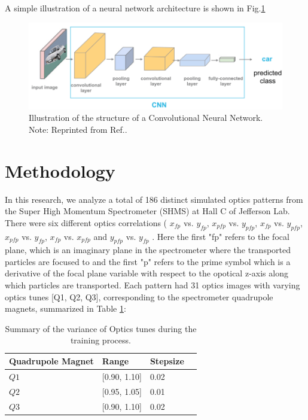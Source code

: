 \documentclass[conference]{IEEEtran}
\begin{document}
A simple illustration of a neural network architecture is shown in Fig.\ref{fig:CNN_Image} 
\begin{figure}[h]
 \centering
  \includegraphics[scale=0.3]{images/ConvolutionalNeuralNetwork.png}
  \caption{Illustration of the structure of a Convolutional Neural Network. \\ \centering Note: Reprinted from Ref.\cite{CNN_Image}.}
  \label{fig:CNN_Image}
\end{figure}



\section{Methodology}
In this research, we analyze a total of 186 distinct simulated optics patterns from the Super High Momentum Spectrometer (SHMS) at Hall C of Jefferson Lab.
There were six different optics correlations ( $x_{fp}$ vs. $y_{fp}$,  $x_{pfp}$ vs. $y_{pfp}$, $x_{fp}$ vs. $y_{pfp}$,  $x_{pfp}$ vs. $y_{fp}$, $x_{fp}$ vs. $x_{pfp}$ and  $y_{pfp}$ vs. $y_{fp}$ . Here the first "fp" refers to the focal plane, which is an imaginary plane in the spectrometer where the transported particles are focused to and the first "p" refers to the prime symbol which is a derivative of the focal plane variable with respect to the opotical z-axis along which particles are transported. Each pattern had 31 optics images with varying optics tunes [Q1, Q2, Q3], corresponding to the spectrometer quadrupole magnets, summarized in Table \ref{tab:tune_stpSize}:

\begin{table}[ht!]
	\begin{center}
		\begin{tabular}{llll} %
                  \hline
                  Quadrupole Magnet & Range & Stepsize \\
                  \hline\hline
	          $Q1$ & [0.90, 1.10] & 0.02  \\
                  $Q2$ & [0.95, 1.05] & 0.01  \\
                  $Q3$ & [0.90, 1.10] & 0.02  \\                       
                  \hline 
		\end{tabular}
	\end{center}
	\caption{Summary of the variance of Optics tunes during the training process.}
	\label{tab:tune_stpSize}
\end{table}
\end{document}
